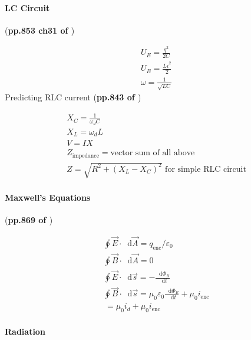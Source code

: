\documentclass{article}
\newcommand*\diff{\mathop{}\!\mathrm{d}}
\numberwithin{equation}{subsection} %
\theoremstyle{definition}
\begin{document}
\paragraph{LC Circuit} (\textbf{pp.853 ch31 of \cite{book}})

\begin{align}
    & U_E = \frac{q^2}{2C} \\
    & U_B = \frac{L i^2}{2} \\
    & \omega = \frac{1}{\sqrt{LC}}
\end{align}
Predicting RLC current (\textbf{pp.843 of \cite{book}})

\begin{align}
    & X_C = \frac{1}{\omega_d C} \\
    & X_L = \omega_d L \\
    & V = I X \\
    & Z_\text{impedance} = \text{vector sum of all above} \\
    & Z = \sqrt{R^2+(X_L-X_C)^2}  \text{ for simple RLC circuit}
\end{align}
\paragraph{Maxwell's Equations} (\textbf{pp.869 of \cite{book}})

\begin{align}
    & \oint \vec{E} \cdot \diff \vec{A} = q_\text{enc}/\varepsilon_0
    \\
    & \oint \vec{B} \cdot\diff\vec{A} = 0 \\
    & \oint \vec{E}\cdot\diff\vec{s} = -\frac{\diff\Phi_B}{\diff t} \\
    & \oint \vec{B}\cdot\diff\vec{s} = 
    \mu_0\varepsilon_0 \frac{\diff\Phi_E}{\diff t} +\mu_0 i_\text{enc}
    \nonumber\\
    & \,= \mu_0 i_d + \mu_0 i_\text{enc}
\end{align}

\paragraph{Radiation} $ $
\end{document}
